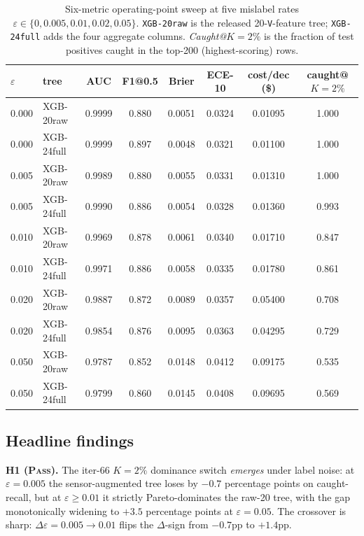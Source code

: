 \begin{table}[t]
\centering\small
\caption{Six-metric operating-point sweep at five mislabel rates
$\varepsilon \in \{0, 0.005, 0.01, 0.02, 0.05\}$. \texttt{XGB-20raw} is
the released 20-\texttt{V}-feature tree; \texttt{XGB-24full} adds the
four aggregate columns. \emph{Caught@$K{=}2\%$} is the fraction of
test positives caught in the top-200 (highest-scoring) rows.}
\label{tab:p8-mislabel-main}
\begin{tabular}{llcccccc}
\toprule
$\varepsilon$ & tree       & AUC    & F1@0.5 & Brier & ECE-10 & cost/dec (\$) & caught@$K{=}2\%$ \\
\midrule
0.000 & XGB-20raw  & 0.9999 & 0.880  & 0.0051 & 0.0324 & 0.01095 & 1.000 \\
0.000 & XGB-24full & 0.9999 & 0.897  & 0.0048 & 0.0321 & 0.01100 & 1.000 \\
0.005 & XGB-20raw  & 0.9989 & 0.880  & 0.0055 & 0.0331 & 0.01310 & 1.000 \\
0.005 & XGB-24full & 0.9990 & 0.886  & 0.0054 & 0.0328 & 0.01360 & 0.993 \\
0.010 & XGB-20raw  & 0.9969 & 0.878  & 0.0061 & 0.0340 & 0.01710 & 0.847 \\
0.010 & XGB-24full & 0.9971 & 0.886  & 0.0058 & 0.0335 & 0.01780 & 0.861 \\
0.020 & XGB-20raw  & 0.9887 & 0.872  & 0.0089 & 0.0357 & 0.05400 & 0.708 \\
0.020 & XGB-24full & 0.9854 & 0.876  & 0.0095 & 0.0363 & 0.04295 & 0.729 \\
0.050 & XGB-20raw  & 0.9787 & 0.852  & 0.0148 & 0.0412 & 0.09175 & 0.535 \\
0.050 & XGB-24full & 0.9799 & 0.860  & 0.0145 & 0.0408 & 0.09695 & 0.569 \\
\bottomrule
\end{tabular}
\end{table}

\subsection{Headline findings}

\textbf{H1 (\textsc{Pass}).} The iter-66 $K{=}2\%$ dominance switch
\emph{emerges} under label noise: at $\varepsilon{=}0.005$ the
sensor-augmented tree loses by $-0.7$ percentage points on
caught-recall, but at $\varepsilon{\geq}0.01$ it strictly Pareto-dominates
the raw-20 tree, with the gap monotonically widening to $+3.5$ percentage
points at $\varepsilon{=}0.05$. The crossover is sharp:
$\Delta\varepsilon{=}0.005 \to 0.01$ flips the $\Delta$-sign from
$-0.7$pp to $+1.4$pp.

